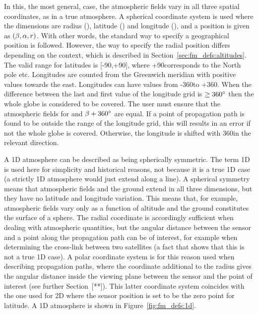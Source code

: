  In this, the most general, case, the atmospheric
fields vary in all three spatial coordinates, as in a true atmosphere.
A spherical coordinate system is used where the dimensions are radius
(\Rds), latitude (\Lat) and longitude (\Lon), and a position is given
as $(\beta,\alpha,r)$. With other words, the standard way to specify a
geographical position is followed. However, the way to specify the
radial position differs depending on the context, which is described
in Section~\ref{sec:fm_defs:altitudes}. The valid range for latitudes
is [-90\degree,+90\degree], where +90\degree corresponds to the North
pole etc. Longitudes are counted from the Greenwich meridian with
positive values towards the east. Longitudes can have values from
-360\degree to +360\degree. When the difference between the last and
first value of the longitude grid is $\geq 360^\circ$ then the whole
globe is considered to be covered. The user must ensure that the
atmospheric fields for \Lon and $\beta+360^\circ$ are equal. If a
point of propagation path is found to be outside the range of the
longitude grid, this will results in an error if not the whole globe
is covered. Otherwise, the longitude is shifted with 360\degree in
the relevant direction.

 A 1D atmosphere can be described as being
spherically symmetric. The term 1D is used here for simplicity and
historical reasons, not because it is a true 1D case (a strictly 1D
atmosphere would just extend along a line). A spherical symmetry means
that atmospheric fields and the ground extend in all three dimensions,
but they have no latitude and longitude variation. This means that,
for example, atmospheric fields vary only as a function of altitude
and the ground constitutes the surface of a sphere. The radial
coordinate is accordingly sufficient when dealing with atmospheric
quantities, but the angular distance between the sensor and a point
along the propagation path can be of interest, for example when
determining the cross-link between two satellites (a fact that shows
that this is not a true 1D case). A polar coordinate system is for
this reason used when describing propagation paths, where the
coordinate additional to the radius gives the angular distance inside
the viewing plane between the sensor and the point of interest (see
further Section~[**]).  This latter coordinate system coincides with
the one used for 2D where the sensor position is set to be the zero
point for latitude. A 1D atmosphere is shown in
Figure~\ref{fig:fm_defs:1d}.

